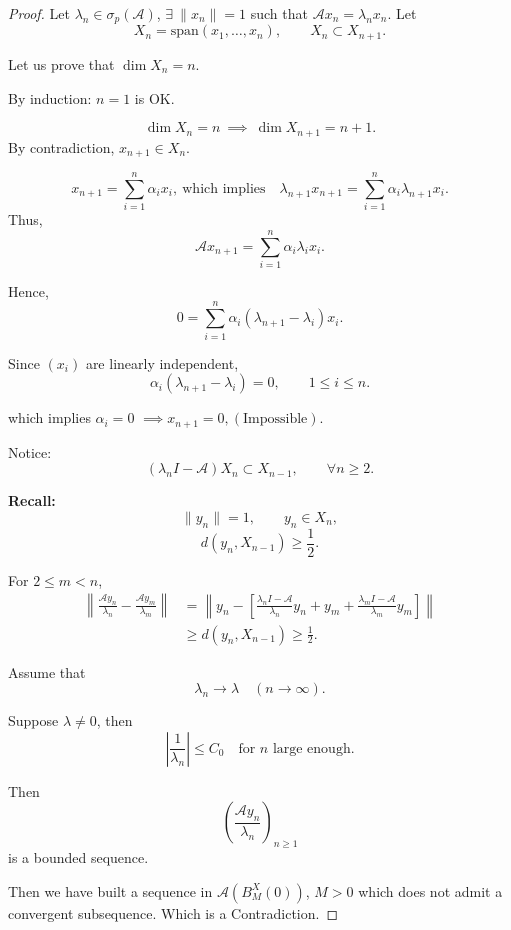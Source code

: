 \documentclass[12pt, oneside]{book}
\begin{document}
\begin{proof}
Let $\lambda_n \in \sigma_p(\mathscr{A})$, $\exists \ \|x_n\|=1$ such that
$
\mathscr{A}x_n=\lambda_n x_n.
$ Let
\[
X_n=\mathrm{span}(x_1,\ldots,x_n), \qquad X_n \subset X_{n+1}.
\]

Let us prove that $\dim X_n=n$.

\medskip

By induction: $n=1$ is OK.

\[
\dim X_n=n \ \implies\ \dim X_{n+1}=n+1.
\]
By contradiction, $x_{n+1}\in X_n$.

\[
x_{n+1}=\sum_{i=1}^n \alpha_i x_i,\
\text{which implies} \quad
\lambda_{n+1} x_{n+1}
=
\sum_{i=1}^n \alpha_i \lambda_{n+1} x_i.
\]
Thus,
\[
\mathscr{A}x_{n+1}
=
\sum_{i=1}^n \alpha_i \lambda_i x_i.
\]

Hence,
\[
0=\sum_{i=1}^n \alpha_i(\lambda_{n+1}-\lambda_i)x_i.
\]

Since $(x_i)$ are linearly independent,
\[
\alpha_i(\lambda_{n+1}-\lambda_i)=0,
\qquad 1\le i\le n.
\]

which implies
$\alpha_i=0$
$
\implies x_{n+1}=0, (\text{Impossible}).
$

\medskip

Notice:
\[
(\lambda_n I-\mathscr{A})X_n \subset X_{n-1},\qquad \forall n\ge2.
\]

\medskip

\textbf{Recall:}
\[
\|y_n\|=1,\qquad y_n\in X_n,
\]
\[
d(y_n,X_{n-1})\ge \frac12.
\]

\medskip

For $2\le m<n$,
\begin{align*}
	\left\|\frac{\mathscr{A}y_n}{\lambda_n}-\frac{\mathscr{A}y_m}{\lambda_m}\right\|
	&=
	\left\|y_n-
	\left[
	\frac{\lambda_n I-\mathscr{A}}{\lambda_n}y_n
	+y_m+
	\frac{\lambda_m I-\mathscr{A}}{\lambda_m}y_m
	\right]\right\| \\
	&\ge d(y_n,X_{n-1})
	\ge \frac12.
\end{align*}

Assume that
\[
\lambda_n \to \lambda \quad (n\to\infty).
\]

Suppose $\lambda\ne0$, then
\[
\left|\frac1{\lambda_n}\right|\le C_0
\quad \text{for $n$ large enough}.
\]

Then
\[
\left(\frac{\mathscr{A}y_n}{\lambda_n}\right)_{n\ge1}
\]
is a bounded sequence.

Then we have built a sequence in
$
\mathscr{A}(B_M^X(0))
$, $M>0$
which does not admit a convergent subsequence. Which is a Contradiction.
\end{proof}
\end{document}

